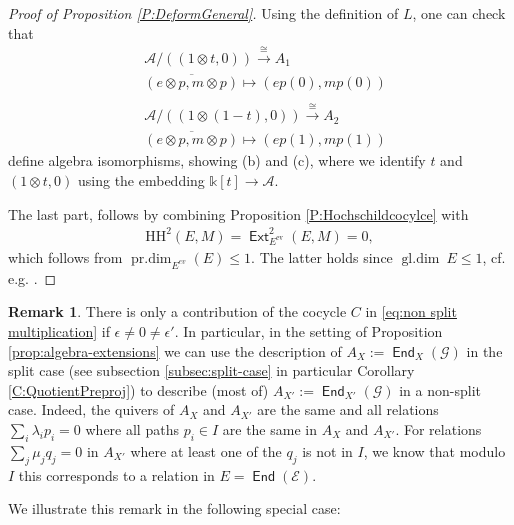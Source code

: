 \documentclass[a4paper,11pt, reqno]{amsart}
\def\sE{\mathscr{E}}
\def\sG{\mathscr{G}}
\def\gldim{{\operatorname{gl.dim}\ }}
\def\projdim{{\operatorname{pr.dim}}}
\newcommand{\opname}[1]{\operatorname{\mathsf{#1}}}
\newcommand{\End}{\opname{End}}
\newcommand{\Ext}{\opname{Ext}}
\theoremstyle{plain}
\theoremstyle{definition}
\newtheorem{remark}[dummy]{Remark}
\numberwithin{equation}{section}
\newlength{\arrow}
\begin{document}
\begin{proof}[Proof of Proposition \ref{P:DeformGeneral}]
Using the definition of $L$, one can check that 
\begin{align*}
    &\mathcal{A}/((1 \otimes t, 0)) \xrightarrow{\cong} A_1 \\
     &\overline{(e \otimes p, m \otimes p)} \mapsto  (e p(0), m p(0)) \\ \\
     &\mathcal{A}/((1 \otimes (1-t),0)) \xrightarrow{\cong} A_2 \\
     &\overline{(e \otimes p, m \otimes p)} \mapsto  (e p(1), m p(1))  
\end{align*}
define algebra isomorphisms, showing (b) and (c), where we identify $t$ and $(1 \otimes t, 0)$ using the embedding $\mathbb{k}[t] \to \mathcal{A}$. 

The last part, follows by combining Proposition \ref{P:Hochschildcocylce} with 
\begin{align}
 \mathrm{HH}^2(E, M)=\Ext^2_{E^{\mathop{ev}}}(E, M)=0,   
\end{align}
which follows from $\projdim_{E^{ev}}(E)\leq 1$. The latter holds since $\gldim E \leq 1$, cf. e.g. \cite[Equation (1.3.)]{ButlerKing}.
\end{proof}


\begin{remark}
    There is only a contribution of the cocycle $C$ in \eqref{eq:non split multiplication} if $\epsilon \neq 0 \neq \epsilon'$. In particular, in the setting of Proposition \ref{prop:algebra-extensions} we can use the description of $A_X:=\End_X(\sG)$ in the split case (see subsection \ref{subsec:split-case} in particular Corollary \ref{C:QuotientPreproj}) to describe (most of) $A_{X'}:=\End_{X'}(\sG)$ in a non-split case. Indeed, the quivers of $A_X$ and $A_{X'}$ are the same  and all relations $\sum_i \lambda_i p_i=0$ where all paths $p_i \in I$ are the same in $A_X$ and $A_{X'}$. For relations $\sum_j \mu_j q_j =0$ in $A_{X'}$ where at least one of the $q_j$ is not in $I$, we know that modulo $I$ this corresponds to a relation in $E=\End(\sE)$.
\end{remark}

We illustrate this remark in the following special case: 
\end{document}
